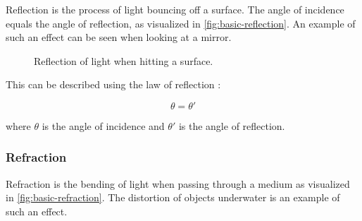 Reflection is the process of light bouncing off a surface. The angle of incidence equals the angle of reflection, as visualized in \autoref{fig:basic-reflection}. An example of such an effect can be seen when looking at a mirror.

\begin{figure}[H]
  \centering
  \caption{Reflection of light when hitting a surface.}
  \label{fig:basic-reflection}
\end{figure}

This can be described using the law of reflection \cite{fowles1989introduction}:

\begin{equation}
  \label{eqn:law-of-reflection}
  \theta = \theta'
\end{equation}

where $\theta$ is the angle of incidence and $\theta'$ is the angle of reflection.

\subsubsection{Refraction}

Refraction is the bending of light when passing through a medium as visualized in \autoref{fig:basic-refraction}. The distortion of objects underwater is an example of such an effect.

